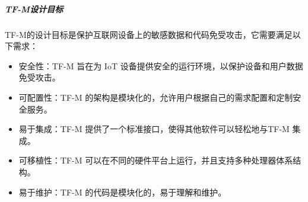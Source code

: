 \documentclass[12pt,a4paper]{ctexart}
\numberwithin{figure}{section}
\begin{document}
\subparagraph{TF-M设计目标}
\par TF-M的设计目标是保护互联网设备上的敏感数据和代码免受攻击，它需要满足以下需求：
\begin{itemize}
    \item 安全性：TF-M 旨在为 IoT 设备提供安全的运行环境，以保护设备和用户数据免受攻击。
    \item 可配置性：TF-M 的架构是模块化的，允许用户根据自己的需求配置和定制安全服务。
    \item 易于集成：TF-M 提供了一个标准接口，使得其他软件可以轻松地与TF-M 集成。
    \item 可移植性：TF-M 可以在不同的硬件平台上运行，并且支持多种处理器体系结构。
    \item 易于维护：TF-M 的代码是模块化的，易于理解和维护。
\end{itemize}
\end{document}
